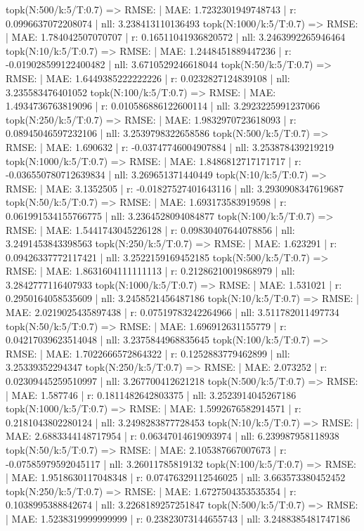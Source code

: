 topk(N:500/k:5/T:0.7) => RMSE: | MAE: 1.7232301949748743 | r: 0.0996637072208074 | nll: 3.238413110136493
topk(N:1000/k:5/T:0.7) => RMSE: | MAE: 1.784042507070707 | r: 0.16511041936820572 | nll: 3.2463992265946464
topk(N:10/k:5/T:0.7) => RMSE: | MAE: 1.2448451889447236 | r: -0.019028599122400482 | nll: 3.6710529246618044
topk(N:50/k:5/T:0.7) => RMSE: | MAE: 1.6449385222222226 | r: 0.0232827124839108 | nll: 3.235583476401052
topk(N:100/k:5/T:0.7) => RMSE: | MAE: 1.4934736763819096 | r: 0.010586886122600114 | nll: 3.2923225991237066
topk(N:250/k:5/T:0.7) => RMSE: | MAE: 1.9832970723618093 | r: 0.08945046597232106 | nll: 3.2539798322658586
topk(N:500/k:5/T:0.7) => RMSE: | MAE: 1.690632 | r: -0.03747746004907884 | nll: 3.253878439219219
topk(N:1000/k:5/T:0.7) => RMSE: | MAE: 1.8486812717171717 | r: -0.036550780712639834 | nll: 3.269651371440449
topk(N:10/k:5/T:0.7) => RMSE: | MAE: 3.1352505 | r: -0.01827527401643116 | nll: 3.2930908347619687
topk(N:50/k:5/T:0.7) => RMSE: | MAE: 1.693173583919598 | r: 0.061991534155766775 | nll: 3.2364528094084877
topk(N:100/k:5/T:0.7) => RMSE: | MAE: 1.5441743045226128 | r: 0.09830407644078856 | nll: 3.2491453843398563
topk(N:250/k:5/T:0.7) => RMSE: | MAE: 1.623291 | r: 0.09426337772117421 | nll: 3.2522159169452185
topk(N:500/k:5/T:0.7) => RMSE: | MAE: 1.8631604111111113 | r: 0.21286210019868979 | nll: 3.2842777116407933
topk(N:1000/k:5/T:0.7) => RMSE: | MAE: 1.531021 | r: 0.2950164058535609 | nll: 3.2458521456487186
topk(N:10/k:5/T:0.7) => RMSE: | MAE: 2.0219025435897438 | r: 0.07519783242264966 | nll: 3.511782011497734
topk(N:50/k:5/T:0.7) => RMSE: | MAE: 1.696912631155779 | r: 0.04217039623514048 | nll: 3.2375844968835645
topk(N:100/k:5/T:0.7) => RMSE: | MAE: 1.7022666572864322 | r: 0.1252883779462899 | nll: 3.25339352294347
topk(N:250/k:5/T:0.7) => RMSE: | MAE: 2.073252 | r: 0.02309445259510997 | nll: 3.267700412621218
topk(N:500/k:5/T:0.7) => RMSE: | MAE: 1.587746 | r: 0.1811482642803375 | nll: 3.2523914045267186
topk(N:1000/k:5/T:0.7) => RMSE: | MAE: 1.5992676582914571 | r: 0.2181043802280124 | nll: 3.2498283877728453
topk(N:10/k:5/T:0.7) => RMSE: | MAE: 2.6883344148717954 | r: 0.06347014619093974 | nll: 6.239987958118938
topk(N:50/k:5/T:0.7) => RMSE: | MAE: 2.105387667007673 | r: -0.07585979592045117 | nll: 3.26011785819132
topk(N:100/k:5/T:0.7) => RMSE: | MAE: 1.9518630117048348 | r: 0.07476329112546025 | nll: 3.663573380452452
topk(N:250/k:5/T:0.7) => RMSE: | MAE: 1.6727504353535354 | r: 0.1038995388842674 | nll: 3.2268189257251847
topk(N:500/k:5/T:0.7) => RMSE: | MAE: 1.5238319999999999 | r: 0.23823073144655743 | nll: 3.2488385481747186
